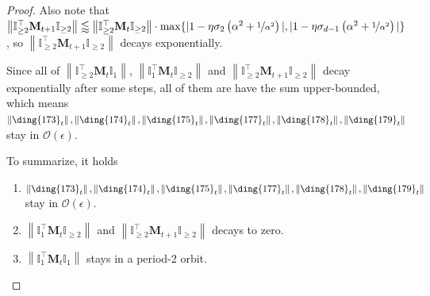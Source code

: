\documentclass{article}
\theoremstyle{plain}
\theoremstyle{remark}
\newcommand{\norm}[1]{\left\lVert#1\right\rVert}
\def\O{\mathcal{O}}
\def\R{\mathbb{R}}
\def\bC{\mathbf{C}}
\def\bX{\mathbf{X}}
\def\bY{\mathbf{Y}}
\newcommand{\cc}[1]{\text{\ding{\number\numexpr#1 + 171\relax}}}
\begin{document}
\begin{proof}
    Also note that $\norm{\mathbb{I}_{\ge2}^\top\mathbf{M}_{t+1} \mathbb{I}_{\ge2}}\lessapprox\norm{\mathbb{I}_{\ge2}^\top\mathbf{M}_{t} \mathbb{I}_{\ge2}}\cdot\max\{ |1-\eta\sigma_2\left( \alpha^2 + \nicefrac{1}{\alpha^2} \right)|, |1-\eta\sigma_{d-1}\left( \alpha^2 + \nicefrac{1}{\alpha^2} \right)| \}$, so $\norm{\mathbb{I}_{\ge2}^\top\mathbf{M}_{t+1} \mathbb{I}_{\ge2}}$ decays exponentially.

    Since all of $\norm{\mathbb{I}_{\ge2}^\top\mathbf{M}_{t}\mathbb{I}_1}$, $\norm{\mathbb{I}_{1}^\top\mathbf{M}_{t}\mathbb{I}_{\ge2}}$ and $\norm{\mathbb{I}_{\ge2}^\top\mathbf{M}_{t+1} \mathbb{I}_{\ge2}}$ decay exponentially after some steps, all of them are have the sum upper-bounded, which means $\norm{\cc{2}_t}, \norm{\cc{3}_t}, \norm{\cc{4}_t}, \norm{\cc{6}_t}, \norm{\cc{7}_t}, \norm{\cc{8}_t}$ stay in $\O(\epsilon)$.

    To summarize, it holds
    \begin{enumerate}
        \item $\norm{\cc{2}_t}, \norm{\cc{3}_t}, \norm{\cc{4}_t}, \norm{\cc{6}_t}, \norm{\cc{7}_t}, \norm{\cc{8}_t}$ stay in $\O(\epsilon)$.
        \item $\norm{\mathbb{I}_{1}^\top\mathbf{M}_{t}\mathbb{I}_{\ge2}}$ and $\norm{\mathbb{I}_{\ge2}^\top\mathbf{M}_{t+1} \mathbb{I}_{\ge2}}$ decays to zero.
        \item $\norm{\mathbb{I}_{1}^\top\mathbf{M}_{t}\mathbb{I}_{1}}$ stays in a period-2 orbit.
    \end{enumerate}

\end{proof}


\end{document}
